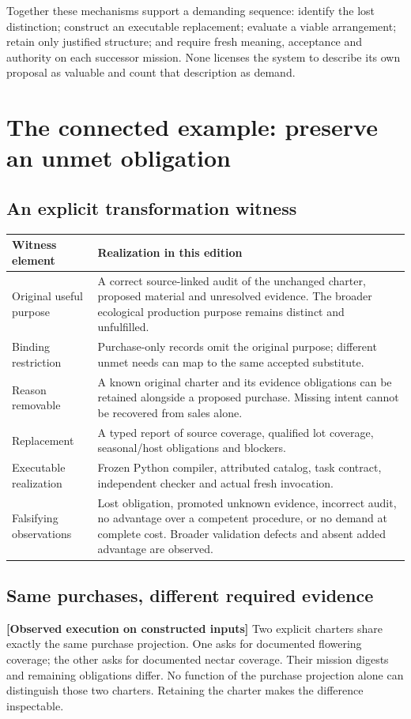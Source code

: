 \documentclass[11pt]{article}
\newcommand{\evidence}[1]{\textbf{[#1]}}
\begin{document}
Together these mechanisms support a demanding sequence: identify the lost distinction; construct an executable replacement; evaluate a viable arrangement; retain only justified structure; and require fresh meaning, acceptance and authority on each successor mission. None licenses the system to describe its own proposal as valuable and count that description as demand.

\section{The connected example: preserve an unmet obligation}
\subsection{An explicit transformation witness}
\begin{tabularx}{\textwidth}{@{}p{35mm}Y@{}}
\toprule
Witness element & Realization in this edition\\\midrule
Original useful purpose & A correct source-linked audit of the unchanged charter, proposed material and unresolved evidence. The broader ecological production purpose remains distinct and unfulfilled.\\
Binding restriction & Purchase-only records omit the original purpose; different unmet needs can map to the same accepted substitute.\\
Reason removable & A known original charter and its evidence obligations can be retained alongside a proposed purchase. Missing intent cannot be recovered from sales alone.\\
Replacement & A typed report of source coverage, qualified lot coverage, seasonal/host obligations and blockers.\\
Executable realization & Frozen Python compiler, attributed catalog, task contract, independent checker and actual fresh invocation.\\
Falsifying observations & Lost obligation, promoted unknown evidence, incorrect audit, no advantage over a competent procedure, or no demand at complete cost. Broader validation defects and absent added advantage are observed.\\
\bottomrule
\end{tabularx}

\subsection{Same purchases, different required evidence}
\evidence{Observed execution on constructed inputs} Two explicit charters share exactly the same purchase projection. One asks for documented flowering coverage; the other asks for documented nectar coverage. Their mission digests and remaining obligations differ. No function of the purchase projection alone can distinguish those two charters. Retaining the charter makes the difference inspectable.
\end{document}
